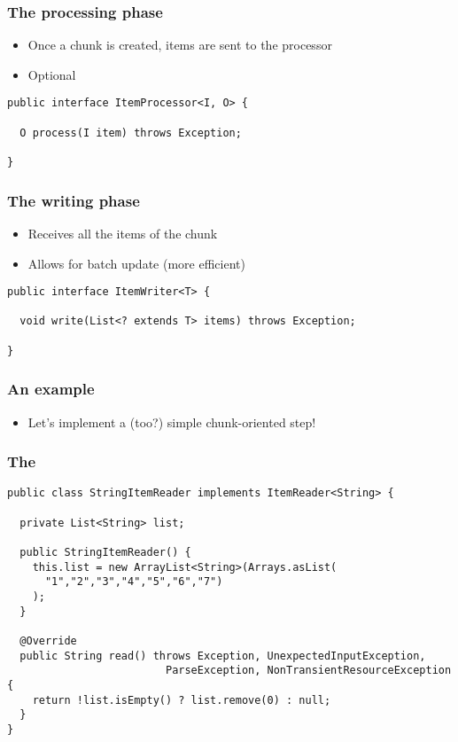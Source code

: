 \begin{frame}[fragile]
\frametitle{The processing phase}
\begin{itemize}
 \item Once a chunk is created, items are sent to the processor
 \item Optional
\end{itemize}

\lstset{language=Java}
\begin{lstlisting}
public interface ItemProcessor<I, O> {

  O process(I item) throws Exception;

}
\end{lstlisting}
\end{frame}

\begin{frame}[fragile]
\frametitle{The writing phase}
\begin{itemize}
 \item Receives all the items of the chunk
 \item Allows for batch update (more efficient)
\end{itemize}

\lstset{language=Java}
\begin{lstlisting}
public interface ItemWriter<T> {

  void write(List<? extends T> items) throws Exception;

}
\end{lstlisting}
\end{frame}

\begin{frame}
 \frametitle{An example}
 \begin{itemize}
  \item Let's implement a (too?) simple chunk-oriented step!  
 \end{itemize}
\end{frame}

\begin{frame}[fragile]
\frametitle{The }
\lstset{language=Java}
\begin{lstlisting}
public class StringItemReader implements ItemReader<String> {

  private List<String> list;

  public StringItemReader() {
    this.list = new ArrayList<String>(Arrays.asList(
      "1","2","3","4","5","6","7")
    );
  }

  @Override
  public String read() throws Exception, UnexpectedInputException,
                         ParseException, NonTransientResourceException {
    return !list.isEmpty() ? list.remove(0) : null;
  }
}
\end{lstlisting}
\end{frame}

